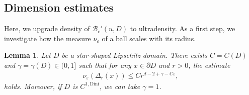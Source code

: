 \documentclass[a4paper,12pt]{article}
\newtheorem{lemma}[theorem]{Lemma}
\theoremstyle{definition}
\theoremstyle{definition}
\begin{document}
	\subsection{Dimension estimates}
	Here, we upgrade density of $\mathcal B_c'(u,D)$ to ultradensity. As a first step, we investigate how the measure $\nu_\varepsilon$ of a ball scales with its radius.
	\begin{lemma}
		Let $D$ be a star-shaped Lipschitz domain. There exists $C=C(D)$ and $\gamma=\gamma(D)\in(0,1]$ such that for any $x\in\partial D$ and $r>0$, the estimate
		\begin{align*}
			\nu_\varepsilon(\Delta_r(x))\leq C r^{d-2+\gamma-C\varepsilon},
		\end{align*}
		holds. Moreover, if $D$ is $C^{1,\mathrm{Dini}}$, we can take $\gamma=1$.
	\end{lemma}	
\end{document}
